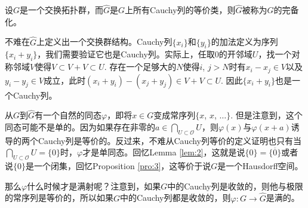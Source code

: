 \begin{para}
	设$G$是一个交换拓扑群，而$\hat G$是$G$上所有Cauchy列的等价类，则$\hat G$被称为$G$的完备化。

	不难在$\hat G$上定义出一个交换群结构。Cauchy列$\{x_i\}$和$\{y_i\}$的加法定义为序列$\{x_i+y_i\}$，我们需要验证它也是Cauchy列。实际上，任取$0$的开邻域$U$，找一个对称邻域$V$使得$V\subset V+V\subset U$. 存在一个足够大的$N$使得$i$, $j>N$时有$x_i-x_j\in V$以及$y_i-y_j\in V$成立，此时$(x_i+y_i)-(x_j+y_j)\in V+V\subset U$. 因此$\{x_i+y_i\}$也是一个Cauchy列。

	从$G$到$\hat G$有一个自然的同态$\varphi$，即将$x\in G$变成常序列$\{x$, $x$, $\dots\}$. 但是注意到，这个同态可能不是单的。因为如果存在非零的$a\in\bigcap_{U\subset \mathscr{O}}U$，则$\varphi(x)$与$\varphi(x+a)$诱导的两个Cauchy列是等价的。反过来，不难从Cauchy列等价的定义证明也只有当$\bigcap_{U\subset \mathscr{O}}U=\{0\}$时，$\varphi$才是单同态。回忆Lemma \ref{lem:2}，这就是说$\{0\}=\overline{\{0\}}$或者说$\{0\}$是一个闭集，回忆Proposition \ref{pro:3}，这等价于说$G$是一个Hausdorff空间。

	那么$\varphi$什么时候才是满射呢？注意到，如果$G$中的Cauchy列是收敛的，则他与极限的常序列是等价的，所以如果$G$中的Cauchy列都是收敛的，则$\varphi:G\to \hat{G}$是满的。
\end{para}

